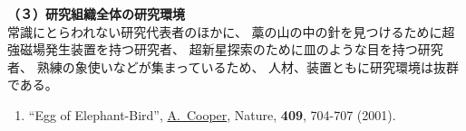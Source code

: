	\noindent
	\textbf{（３）研究組織全体の研究環境}\\
\JSPSInstructionsB	%
	常識にとらわれない研究代表者のほかに、
	藁の山の中の針を見つけるために超強磁場発生装置を持つ研究者、
	超新星探索のために皿のような目を持つ研究者、
	熟練の象使いなどが集まっているため、
	人材、装置ともに研究環境は抜群である。
	\begin{enumerate}
			\label{pub:whale}
				
			\label{pub:theoegg}
				
		

			{JofUR\\({\tt www.universalrejection.org})}{{\bf N/A}}{2002}
		
		\item ``Egg of Elephant-Bird'', 
				\underline{A.~Cooper},
				Nature, {\bf 409}, 704-707 (2001).	%
	\end{enumerate}



